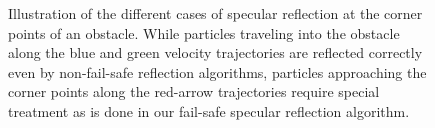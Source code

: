 \begin{figure}
        
        
        
    \caption{Illustration of the different cases of specular reflection at the corner points of an obstacle. While particles traveling into the obstacle along the blue and green velocity trajectories are reflected correctly even by non-fail-safe reflection algorithms, particles approaching the corner points along the red-arrow trajectories require special treatment as is done in our fail-safe specular reflection algorithm.
 }
    
    \label{fig:example_wrong}
\end{figure}





